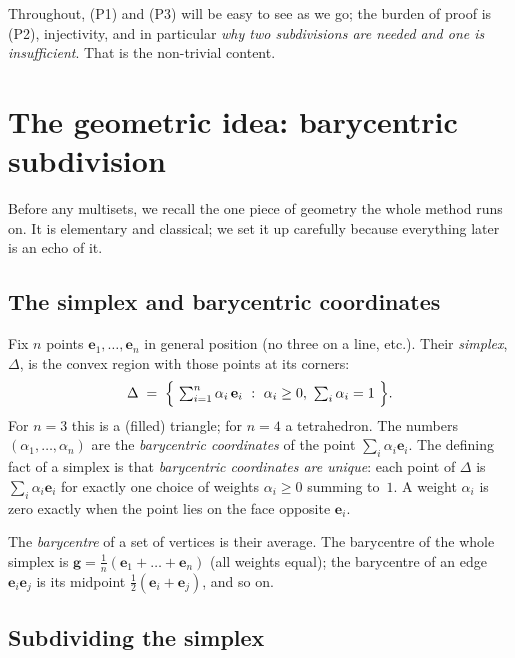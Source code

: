 \documentclass[11pt,a4paper]{article}
\theoremstyle{definition}
\theoremstyle{plain}
\newcommand{\bvec}[1]{\mathbf{#1}}
\begin{document}
\noindent
Throughout, (P1) and (P3) will be easy to see as we go; the burden of proof is
(P2), injectivity, and in particular \emph{why two subdivisions are needed and
one is insufficient}. That is the non-trivial content.

\section{The geometric idea: barycentric subdivision}
\label{sec:bary}

Before any multisets, we recall the one piece of geometry the whole method runs
on. It is elementary and classical; we set it up carefully because everything
later is an echo of it.

\subsection{The simplex and barycentric coordinates}

Fix $n$ points $\bvec e_1,\dots,\bvec e_n$ in general position (no three on a
line, etc.). Their \emph{simplex}, $\Delta$,  is the convex region with those points at its corners:
\[
   \Delta \;=\; \Bigl\{\ \textstyle\sum_{i=1}^n \alpha_i\,\bvec e_i\ :\
        \alpha_i\ge 0,\ \textstyle\sum_i\alpha_i=1\ \Bigr\}.
\]
For $n=3$ this is a (filled) triangle; for $n=4$ a tetrahedron. The numbers
$(\alpha_1,\dots,\alpha_n)$ are the \emph{barycentric coordinates} of the point
$\sum_i\alpha_i\bvec e_i$. The defining fact of a simplex is that
\emph{barycentric coordinates are unique}: each point of $\Delta$ is
$\sum_i\alpha_i\bvec e_i$ for exactly one choice of weights $\alpha_i\ge0$
summing to~$1$. A weight $\alpha_i$ is zero exactly when the point lies on the
face opposite $\bvec e_i$.

The \emph{barycentre} of a set of vertices is their average. The barycentre of
the whole simplex is $\bvec g=\tfrac1n(\bvec e_1+\dots+\bvec e_n)$ (all weights
equal); the barycentre of an edge $\bvec e_i\bvec e_j$ is its midpoint
$\tfrac12(\bvec e_i+\bvec e_j)$, and so on.

\subsection{Subdividing the simplex}
\end{document}
